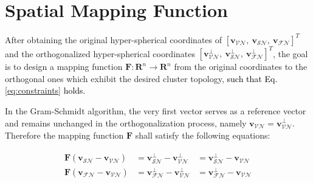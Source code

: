 \section{Spatial Mapping Function}
After obtaining the original hyper-spherical coordinates of $[\mathbf{v}_{\mathcal{VN}},~\mathbf{v}_{\mathcal{SN}},~\mathbf{v}_{\mathcal{FN}}]^T$ and the orthogonalized hyper-spherical coordinates $[\mathbf{v}_{\mathcal{VN}}^{\perp},~\mathbf{v}_{\mathcal{SN}}^{\perp},~\mathbf{v}_{\mathcal{FN}}^{\perp}]^T$, the goal is to design a mapping function $\mathbf{F}: \mathbf{R}^n \to \mathbf{R}^n$ from the original coordinates to the orthogonal ones which exhibit the desired cluster topology, \textcolor{black}{such that Eq. \ref{eq:constraints} holds.}

In the Gram-Schmidt algorithm, the very first vector serves as a reference vector and remains unchanged in the orthogonalization process, namely $\mathbf{v}_{\mathcal{VN}} = \mathbf{v}_{\mathcal{VN}}^{\perp}$. Therefore the mapping function $\mathbf{F}$ shall satisfy the following equations:

\begin{align}
\label{eq:constraints}
\begin{aligned}
\mathbf{F}(\mathbf{v}_{\mathcal{SN}} - \mathbf{v}_{\mathcal{VN}}) &= \mathbf{v}_{\mathcal{SN}}^{\perp} - \mathbf{v}_{\mathcal{VN}}^{\perp} &= \mathbf{v}_{\mathcal{SN}}^{\perp} - \mathbf{v}_{\mathcal{VN}}\\
\mathbf{F}(\mathbf{v}_{\mathcal{FN}} - \mathbf{v}_{\mathcal{VN}}) &= \mathbf{v}_{\mathcal{FN}}^{\perp} - \mathbf{v}_{\mathcal{VN}}^{\perp} &= \mathbf{v}_{\mathcal{FN}}^{\perp} - \mathbf{v}_{\mathcal{VN}}
\end{aligned}
\end{align}

